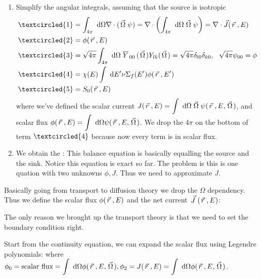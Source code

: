 \documentclass{school-22.211-notes}
\begin{document}
\begin{enumerate}
\item Simplify the angular integrals, assuming that the source is isotropic
\begin{align}
\textcircled{1} &= \int_{4\pi} \dOmega \divergence (\vecOmega \psi) = \divergence \left(\int_{4\pi} \dOmega \vecOmega \psi \right) = \divergence \vec{J} (\vecr, E) \\
\textcircled{2} &= \phi(\vecr, E) \\
\textcircled{3} &= \sqrt{4\pi} \int_{4\pi} \dOmega \bar{Y}_{00}(\vecOmega) Y_{lk} (\vecOmega) = \sqrt{4\pi} \delta_{l0}\delta_{k0}, \fsp \fsp \sqrt{4 \pi } \psi_{00} = \phi \\
\textcircled{4} &= \chi(E) \int \dE' \nu \Sigma_f (E') \phi(\vecr, E') \\
\textcircled{5} &= S_0 (\vecr, E) 
\end{align}
where we've defined the scalar current $\displaystyle J(\left.\vec{r}\right., E) = \int \mbox{ }\mathrm{d} \Omega \left.\vec{\Omega}\right. \psi (\left.\vec{r}\right., E, \left.\vec{\Omega}\right.)$, and scalar flux $\displaystyle \phi(\left.\vec{r}\right., E) = \int \mbox{ }\mathrm{d} \Omega \psi(\left.\vec{r}\right., E,  \left.\vec{\Omega}\right.)$. We drop the $4 \pi$ on the bottom of term $\textcircled{4}$ because now every term is in scalar flux. 

\item We obtain the : \scriptsize
{} \normalsize
This balance equation is basically equalling the source and the sink. Notice this equation is exact so far. The problem is this is one quation with two unknowns $\phi, J$. Thus we need to approximate $J$. 
\end{enumerate}

Basically going from transport to diffusion theory we drop the $\Omega$ dependency. Thus we define the scalar flux $\phi(\left.\vec{r}\right., E)$ and the net current $\left.\vec{J}\right. (\left.\vec{r}\right., E)$: 

The only reason we brought up the transport theory is that we need to set the boundary condition right.  




\clearpage
{}
Start from the continuity equation, we can expand the scalar flux using Legendre polynomials: 
where $\displaystyle \phi_0 = \mbox{scalar flux} = \int \mbox{ }\mathrm{d} \Omega \phi(\left.\vec{r}\right., E, \left.\vec{\Omega}\right.), \phi_2 = J(\left.\vec{r}\right., E) = \int \mbox{ }\mathrm{d} \Omega \phi(\left.\vec{r}\right., E, \left.\vec{\Omega}\right.)$. 
\end{document}

